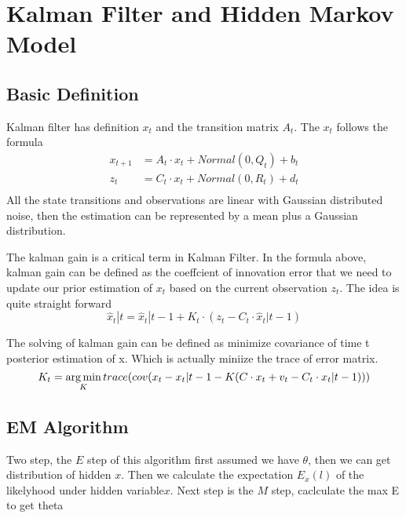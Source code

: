 \section{Kalman Filter and Hidden Markov Model}

\subsection{Basic Definition}
Kalman filter has definition $x_t$ and the transition matrix $A_t$. The $x_t$ follows the formula
\begin{equation}
  \begin{aligned}
    x_{t+1} &= A_t \cdot x_t + Normal(0, Q_t) + b_t\\
    z_{t} &= C_t \cdot x_t + Normal(0, R_t) + d_t\\
  \end{aligned}
\end{equation}
All the state transitions and observations are linear with Gaussian distributed noise, then the
estimation can be represented by a mean plus a Gaussian distribution.

The kalman gain is a critical term in Kalman Filter. In the formula above, kalman gain can be defined as the {\color{blue}coeffcient of
innovation error that we need to update our prior estimation of $x_t$ }based on the current observation $z_t$. The idea is quite
straight forward  $$\hat{x}_t|t = \hat{x}_t|t-1 + K_t \cdot (z_t - C_t \cdot \hat{x}_t|t-1)$$

The solving of kalman gain can be defined as minimize covariance of time t posterior estimation of x. Which is actually miniize the trace of error matrix.
\begin{equation}
K_t = \operatorname*{arg\,min}_K trace( cov(x_t - x_t|t-1 - K(C \cdot x_t + v_t - C_t \cdot x_t|t-1)))
\end{equation}

\subsection{EM Algorithm}
Two step, the $E$ step of this algorithm first assumed we have $\theta$, then we can get distribution of hidden $x$. Then we calculate the expectation $E_{x}(l)$ of the likelyhood under hidden variable$x$.
Next step is the $M$ step, caclculate the max E to get theta
